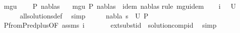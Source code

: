 \begin{isabellebody}
\isamarkupfalse%
\ mgu{\isacharcolon}{\kern0pt}\ \isanewline
\ \ \ {\isachardoublequoteopen}P\ {\isasymTurnstile}{\isacharparenleft}{\kern0pt}nabla{\isacharcomma}{\kern0pt}s{\isacharparenright}{\kern0pt}{\isasymRightarrow}{\isacharparenleft}{\kern0pt}{\isacharbrackleft}{\kern0pt}{\isacharbrackright}{\kern0pt}{\isacharcomma}{\kern0pt}{\isacharbrackleft}{\kern0pt}{\isacharbrackright}{\kern0pt}{\isacharparenright}{\kern0pt}{\isachardoublequoteclose}\isanewline
\ \ \ {\isachardoublequoteopen}mgu\ P\ {\isacharparenleft}{\kern0pt}nabla{\isacharcomma}{\kern0pt}s{\isacharparenright}{\kern0pt}\ {\isasymand}\ idem\ {\isacharparenleft}{\kern0pt}nabla{\isacharcomma}{\kern0pt}s{\isacharparenright}{\kern0pt}{\isachardoublequoteclose}\isanewline
%
\isadelimproof
%
\endisadelimproof
%
\isatagproof
{}\isamarkupfalse%
{\isacharparenleft}{\kern0pt}rule\ mgu{\isacharunderscore}{\kern0pt}idem{\isacharparenright}{\kern0pt}\isanewline
\ \ \isamarkupfalse%
\ i{\isacharcolon}{\kern0pt}\ {\isachardoublequoteopen}{\isacharparenleft}{\kern0pt}{\isacharbraceleft}{\kern0pt}{\isacharbraceright}{\kern0pt}{\isacharcomma}{\kern0pt}{\isacharbrackleft}{\kern0pt}{\isacharbrackright}{\kern0pt}{\isacharparenright}{\kern0pt}\ {\isasymin}\ U\ {\isacharparenleft}{\kern0pt}{\isacharbrackleft}{\kern0pt}{\isacharbrackright}{\kern0pt}{\isacharcomma}{\kern0pt}{\isacharbrackleft}{\kern0pt}{\isacharbrackright}{\kern0pt}{\isacharparenright}{\kern0pt}{\isachardoublequoteclose}\isanewline
\ \ \ \ \isamarkupfalse%
\ all{\isacharunderscore}{\kern0pt}solutions{\isacharunderscore}{\kern0pt}def\ \isamarkupfalse%
\ simp\isanewline
\ \ \isamarkupfalse%
\ \isamarkupfalse%
\ {\isachardoublequoteopen}{\isacharparenleft}{\kern0pt}nabla{\isacharcomma}{\kern0pt}\ s{\isacharparenright}{\kern0pt}\ {\isasymin}\ U\ P{\isachardoublequoteclose}\isanewline
\ \ \ \ \isamarkupfalse%
\ P{}{\isacharunderscore}{\kern0pt}from{\isacharunderscore}{\kern0pt}P{}{\isacharunderscore}{\kern0pt}red{\isacharunderscore}{\kern0pt}plus{\isacharbrackleft}{\kern0pt}OF\ assms\ i{\isacharbrackright}{\kern0pt}\ \isanewline
\ \ \ \ \ \ ext{\isacharunderscore}{\kern0pt}subst{\isacharunderscore}{\kern0pt}id\ \ solution{\isacharunderscore}{\kern0pt}comp{\isacharunderscore}{\kern0pt}id{\isacharparenleft}{\kern0pt}{}{\isacharparenright}{\kern0pt}\ \isamarkupfalse%
\ simp\isanewline
\ \ \ \ \ \ \ \ \ \ \ \ \ \ \ \ \ \ \ \ \ \ \ \ \ \ \ \ \isanewline

\end{isabellebody}
